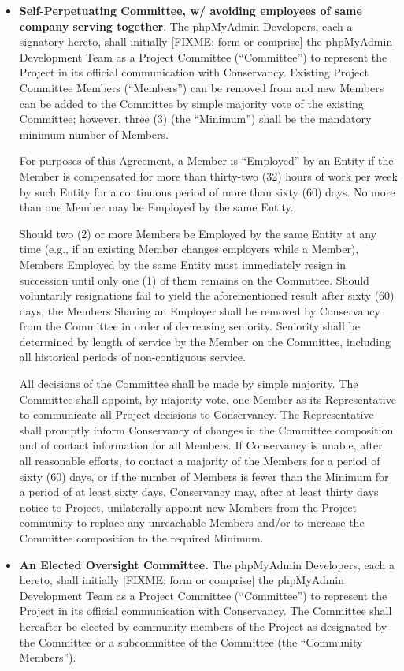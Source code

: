 \documentclass[letterpaper,12pt]{article}
\newcommand{\signatories}{phpMyAdmin Developers\xspace}
\newcommand{\leadershipbody}{phpMyAdmin Development Team\xspace}
\begin{document}
\begin{enumerate}[label=\arabic*.,ref=\S~\arabic*]
\begin{itemize}
\item \textbf{Self-Perpetuating Committee, w/ avoiding employees of same
company serving together}. The \signatories, each a signatory
hereto, shall initially [FIXME: form or comprise] the \leadershipbody
as a Project Committee (``Committee'') to represent the Project
in its official communication with Conservancy. Existing Project
Committee Members (``Members'') can be removed from and new Members
can be added to the Committee by simple majority vote of the existing
Committee; however, three (3) (the ``Minimum'') shall be the mandatory
minimum number of Members.


For purposes of this Agreement, a Member is ``Employed'' by an Entity
if the Member is compensated for more than thirty-two (32) hours of
work per week by such Entity for a continuous period of more than
sixty (60) days. No more than one Member may be Employed by the same
Entity.


Should two (2) or more Members be Employed by the same Entity at any
time (e.g., if an existing Member changes employers while a Member),
Members Employed by the same Entity must immediately resign in succession
until only one (1) of them remains on the Committee. Should voluntarily
resignations fail to yield the aforementioned result after sixty (60)
days, the Members Sharing an Employer shall be removed by Conservancy
from the Committee in order of decreasing seniority. Seniority shall
be determined by length of service by the Member on the Committee,
including all historical periods of non-contiguous service.


All decisions of the Committee shall be made by simple majority. The
Committee shall appoint, by majority vote, one Member as its Representative
to communicate all Project decisions to Conservancy. The Representative
shall promptly inform Conservancy of changes in the Committee composition
and of contact information for all Members. If Conservancy is unable,
after all reasonable efforts, to contact a majority of the Members
for a period of sixty (60) days, or if the number of Members is fewer
than the Minimum for a period of at least sixty days, Conservancy
may, after at least thirty days notice to Project, unilaterally appoint
new Members from the Project community to replace any unreachable
Members and/or to increase the Committee composition to the required
Minimum.

\item \textbf{An Elected Oversight Committee.} The \signatories, each
a hereto, shall initially [FIXME: form or comprise] the 
\leadershipbody as a Project Committee (``Committee'') to 
represent the Project in its official communication with Conservancy.  The
Committee shall hereafter be elected by community members of the Project as
designated by the Committee or a subcommittee of the Committee (the 
``Community Members'').  


\end{itemize}
\end{enumerate}
\end{document}
